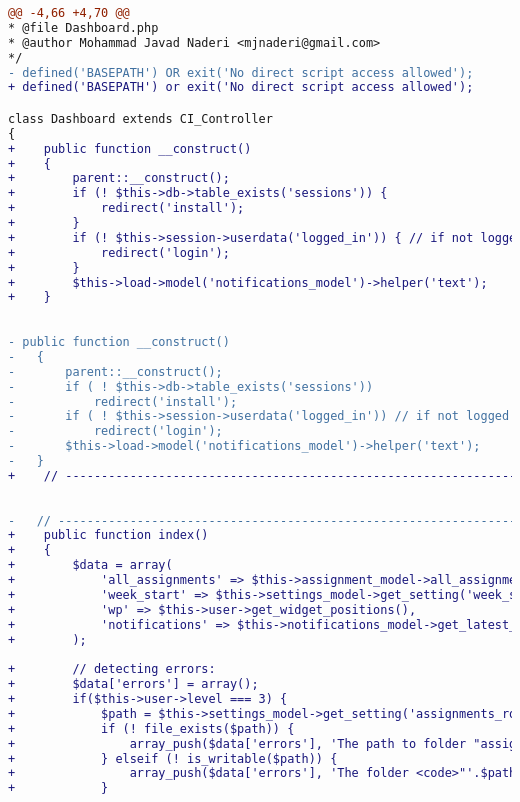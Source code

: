 \begin{lstlisting}[language=diff, basicstyle=\ttfamily, frame=single,
	columns=fullflexible, showtabs=true, keepspaces=true, breaklines=true, label=ck:31, caption=Contoh penggunaan PHP CS Fixer pada \textit{Dashboard.php}]
@@ -4,66 +4,70 @@
* @file Dashboard.php
* @author Mohammad Javad Naderi <mjnaderi@gmail.com>
*/
- defined('BASEPATH') OR exit('No direct script access allowed');
+ defined('BASEPATH') or exit('No direct script access allowed');

class Dashboard extends CI_Controller
{
+    public function __construct()
+    {
+        parent::__construct();
+        if (! $this->db->table_exists('sessions')) {
+            redirect('install');
+        }
+        if (! $this->session->userdata('logged_in')) { // if not logged in
+            redirect('login');
+        }
+        $this->load->model('notifications_model')->helper('text');
+    }
	
	
- public function __construct()
-	{
-		parent::__construct();
-		if ( ! $this->db->table_exists('sessions'))
-			redirect('install');
-		if ( ! $this->session->userdata('logged_in')) // if not logged in
-			redirect('login');
-		$this->load->model('notifications_model')->helper('text');
-	}
+    // ------------------------------------------------------------------------
	
	
-	// ------------------------------------------------------------------------
+    public function index()
+    {
+        $data = array(
+            'all_assignments' => $this->assignment_model->all_assignments(),
+            'week_start' => $this->settings_model->get_setting('week_start'),
+            'wp' => $this->user->get_widget_positions(),
+            'notifications' => $this->notifications_model->get_latest_notifications()
+        );
		
+        // detecting errors:
+        $data['errors'] = array();
+        if($this->user->level === 3) {
+            $path = $this->settings_model->get_setting('assignments_root');
+            if (! file_exists($path)) {
+                array_push($data['errors'], 'The path to folder "assignments" is not set correctly. Move this folder somewhere not publicly accessible, and set its full path in Settings.');
+            } elseif (! is_writable($path)) {
+                array_push($data['errors'], 'The folder <code>"'.$path.'"</code> is not writable by PHP. Make it writable. But make sure that this folder is only accessible by you. Codes will be saved in this folder!');
+            }
			

\end{lstlisting}
